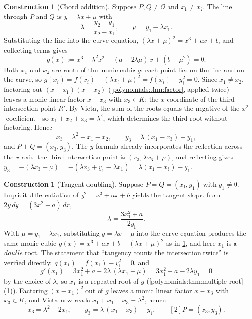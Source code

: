 \documentclass[11pt,a4paper]{article}
\theoremstyle{definition}
\newtheorem{construction}[theorem]{Construction}
\theoremstyle{remark}
\begin{document}
\begin{construction}[Chord addition]\label{ellipticcurves:con-chord}
Suppose \(P, Q \neq \mathcal{O}\) and \(x_1 \neq x_2\). The line
through \(P\) and \(Q\) is \(y = \lambda x + \mu\) with
\[
  \lambda = \frac{y_2 - y_1}{x_2 - x_1}, \qquad
  \mu = y_1 - \lambda x_1 .
\]
Substituting the line into the curve equation,
\((\lambda x + \mu)^2 = x^3 + ax + b\), and collecting terms gives
\[
  g(x) := x^3 - \lambda^2 x^2 + (a - 2\lambda\mu)\, x + (b - \mu^2)
  = 0 .
\]
Both \(x_1\) and \(x_2\) are roots of the monic cubic \(g\): each
point lies on the line and on the curve, so
\(g(x_i) = f(x_i) - (\lambda x_i + \mu)^2 = f(x_i) - y_i^2 = 0\).
Since \(x_1 \neq x_2\), factoring out \((x - x_1)(x - x_2)\)
(\cref{polynomials:thm:factor}, applied twice) leaves a monic linear
factor \(x - x_3\) with \(x_3 \in K\): the \(x\)-coordinate of the
third intersection point \(R'\). By Vieta, the sum of the roots equals
the negative of the \(x^2\)-coefficient---so
\(x_1 + x_2 + x_3 = \lambda^2\), which determines the third root without
factoring. Hence
\begin{equation}\label{ellipticcurves:eq-add}
  x_3 = \lambda^2 - x_1 - x_2, \qquad
  y_3 = \lambda\,(x_1 - x_3) - y_1 ,
\end{equation}
and \(P + Q = (x_3, y_3)\). The \(y\)-formula already incorporates the
reflection across the \(x\)-axis: the third intersection point is
\((x_3, \lambda x_3 + \mu)\), and reflecting gives
\(y_3 = -(\lambda x_3 + \mu)
= -(\lambda x_3 + y_1 - \lambda x_1)
= \lambda(x_1 - x_3) - y_1\).
\end{construction}

\begin{construction}[Tangent doubling]\label{ellipticcurves:con-tangent}
Suppose \(P = Q = (x_1, y_1)\) with \(y_1 \neq 0\). Implicit
differentiation of \(y^2 = x^3 + ax + b\) yields the tangent slope:
from \(2y \, dy = (3x^2 + a)\, dx\),
\[
  \lambda = \frac{3 x_1^2 + a}{2 y_1} .
\]
With \(\mu = y_1 - \lambda x_1\), substituting \(y = \lambda x + \mu\)
into the curve equation produces the same monic cubic
\(g(x) = x^3 + ax + b - (\lambda x + \mu)^2\) as in
\cref{ellipticcurves:con-chord}, and here \(x_1\) is a \emph{double}
root. The statement that ``tangency counts the intersection twice'' is
verified directly: \(g(x_1) = f(x_1) - y_1^2 = 0\), and
\[
  g'(x_1) = 3x_1^2 + a - 2\lambda\,(\lambda x_1 + \mu)
          = 3x_1^2 + a - 2\lambda y_1 = 0
\]
by the choice of \(\lambda\), so \(x_1\) is a repeated root of \(g\)
(\cref{polynomials:thm:multiple-root}(1)). Factoring
\((x - x_1)^2\) out of \(g\) leaves a monic linear factor
\(x - x_3\) with \(x_3 \in K\), and Vieta now reads
\(x_1 + x_1 + x_3 = \lambda^2\), hence
\begin{equation}\label{ellipticcurves:eq-double}
  x_3 = \lambda^2 - 2 x_1, \qquad
  y_3 = \lambda\,(x_1 - x_3) - y_1, \qquad
  [2]P = (x_3, y_3) .
\end{equation}
\end{construction}
\end{document}
